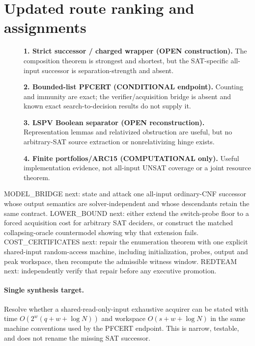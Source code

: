 \documentclass[11pt]{article}
\begin{document}
\section{Updated route ranking and assignments}
\begin{description}
\item[] \textbf{1. Strict successor / charged wrapper (OPEN construction).}
The composition theorem is strongest and shortest, but the SAT-specific
all-input successor is separation-strength and absent.
\item[] \textbf{2. Bounded-list PFCERT (CONDITIONAL endpoint).}
Counting and immunity are exact; the verifier/acquisition bridge is absent
and known exact search-to-decision results do not supply it.
\item[] \textbf{3. LSPV Boolean separator (OPEN reconstruction).}
Representation lemmas and relativized obstruction are useful, but no
arbitrary-SAT source extraction or nonrelativizing hinge exists.
\item[] \textbf{4. Finite portfolios/ARC15 (COMPUTATIONAL only).}
Useful implementation evidence, not all-input UNSAT coverage or a joint
resource theorem.
\end{description}

MODEL\_BRIDGE next: state and attack one all-input ordinary-CNF successor
whose output semantics are solver-independent and whose descendants retain
the same contract.  LOWER\_BOUND next: either extend the switch-probe floor
to a forced acquisition cost for arbitrary SAT deciders, or construct the
matched collapsing-oracle countermodel showing why that extension fails.
COST\_CERTIFICATES next: repair the enumeration theorem with one explicit
shared-input random-access machine, including initialization, probes, output
and peak workspace, then recompute the admissible witness window.  REDTEAM
next: independently verify that repair before any executive promotion.

\paragraph{Single synthesis target.}
Resolve whether a shared-read-only-input exhaustive acquirer can be stated
with time $O(2^w(q+w+\log N))$ and workspace $O(s+w+\log N)$ in the same
machine conventions used by the PFCERT endpoint.  This is narrow, testable,
and does not rename the missing SAT successor.
\end{document}
